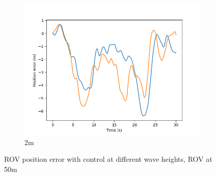 \documentclass[class=article, crop=false]{standalone}
\begin{document}
\begin{figure}
\begin{subfigure}[b]{0.48\textwidth}
        \includegraphics{scenario1/rov-50m/2.0m/rov_position_error_controlled}
        \caption{2m}
        \label{}
    \end{subfigure}

    \caption{ROV position error with control at different wave heights, ROV at 50m}
\end{figure}
\end{document}
